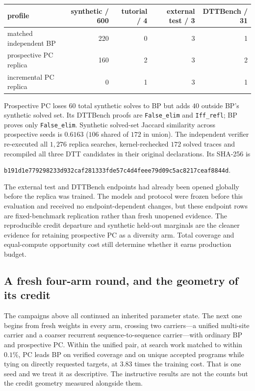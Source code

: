 \documentclass[11pt]{article}
\newcommand{\code}[1]{\texttt{#1}}
\begin{document}
\begin{center}\small
\begin{tabular}{@{}lrrrr@{}}
\toprule
profile & synthetic / 600 & tutorial / 4 & external test / 3 & DTTBench / 31 \\
\midrule
matched independent BP & 220 & 0 & 3 & 1 \\
prospective PC replica & 160 & 2 & 3 & 2 \\
incremental PC replica & 0 & 1 & 3 & 1 \\
\bottomrule
\end{tabular}
\end{center}

Prospective PC loses $60$ total synthetic solves to BP but adds $40$ outside BP's
synthetic solved set. Its DTTBench proofs are \code{False\_elim} and
\code{Iff\_refl}; BP proves only \code{False\_elim}. Synthetic solved-set Jaccard
similarity across prospective seeds is $0.6163$ ($106$ shared of $172$ in union).
The independent verifier re-executed all $1{,}276$ replica searches, kernel-rechecked
$172$ solved traces and recompiled all three DTT candidates in their original
declarations. Its SHA-256 is
\begin{center}
{\scriptsize\nolinkurl{b191d1e779298233d932caf281333fde57c4d4feee79d09c5ac8217ceaf8844d}}.
\end{center}

The external test and DTTBench endpoints had already been opened globally before the
replica was trained. The models and protocol were frozen before this evaluation and
received no endpoint-dependent changes, but these endpoint rows are fixed-benchmark
replication rather than fresh unopened evidence. The reproducible credit departure and
synthetic held-out marginals are the cleaner evidence for retaining prospective PC as a
diversity arm. Total coverage and equal-compute opportunity cost still determine whether
it earns production budget.

\subsection{A fresh four-arm round, and the geometry of its credit}
\label{sec:fresh-round-credit}

The campaigns above all continued an inherited parameter state. The next one begins from
fresh weights in every arm, crossing two carriers---a unified multi-site carrier and a
coarser recurrent sequence-to-sequence carrier---with ordinary BP and prospective PC.
Within the unified pair, at search work matched to within $0.1\%$, PC leads BP on
verified coverage and on unique accepted programs while tying on directly requested
targets, at $3.83$ times the training cost. That is one seed and we treat it as
descriptive. The instructive results are not the counts but the credit geometry
measured alongside them.
\end{document}
